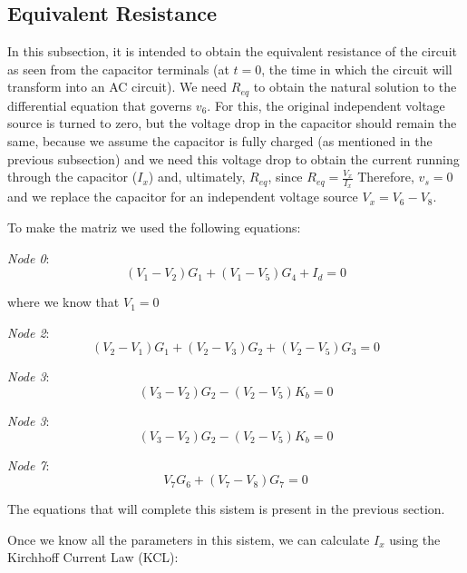 \subsection{Equivalent Resistance}
\label{subsec:Nat_Sol_theory}

In this subsection, it is intended to obtain the equivalent resistance of the circuit as seen from the capacitor terminals (at $t=0$, the time in which the circuit will transform into an AC circuit). We need $R_{eq}$ to obtain the natural solution to the differential equation that governs $v_6$. For this, the original independent voltage source is turned to zero, but the voltage drop in the capacitor should remain the same, because we assume the capacitor is fully charged (as mentioned in the previous subsection) and we need this voltage drop to obtain the current running through the capacitor ($I_x$) and, ultimately, $R_{eq}$, since $R_{eq} = \frac{V_x}{I_x}$ Therefore, $v_s = 0$ and we replace the capacitor for an independent voltage source $V_x = V_6 - V_8$.

To make the matriz we used the following equations:


\textit{Node 0}:
\begin{equation}
  (V_{1} - V_{2})G_{1} + (V_{1} - V_{5})G_{4} + I_d = 0
\end{equation}

where we know that $V_1=0$

\textit{Node 2}:
\begin{equation}
  (V_{2} - V_{1})G_{1} + (V_{2} - V_{3})G_{2} + (V_{2} - V_{5})G_{3}= 0
\end{equation}

\textit{Node 3}:
\begin{equation}
  (V_{3} - V_{2})G_{2} - (V_{2} - V_{5})K_{b} = 0
\end{equation}

\textit{Node 3}:
\begin{equation}
  (V_{3} - V_{2})G_{2} - (V_{2} - V_{5})K_{b} = 0
\end{equation}

\textit{Node 7}:
\begin{equation}
  V_{7}G_{6} + (V_{7} - V_{8})G_{7} = 0
\end{equation}


The equations that will complete this sistem is present in the previous section.

Once we know all the parameters in this sistem, we can calculate $I_x$ using the Kirchhoff Current Law (KCL):

